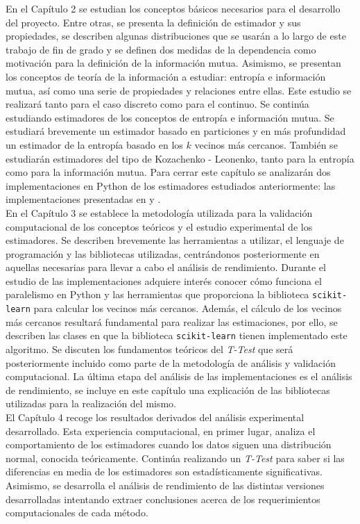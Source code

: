 \documentclass[12pt,a4paper]{report} %
\theoremstyle{definition}
\begin{document}
En el Capítulo 2 se estudian los conceptos básicos necesarios para el desarrollo del proyecto. Entre otras, se presenta la definición de estimador y sus propiedades, se describen algunas distribuciones que se usarán a lo largo de este trabajo de fin de grado y se definen dos medidas de la dependencia como motivación para la definición de la información mutua. Asimismo, se presentan los conceptos de teoría de la información a estudiar: entropía e información mutua, así como una serie de propiedades y relaciones entre ellas. Este estudio se realizará tanto para el caso discreto como para el continuo. Se continúa estudiando estimadores de los conceptos de entropía e información mutua. Se estudiará brevemente un estimador basado en particiones y en más profundidad un estimador de la entropía basado en los $k$ vecinos más cercanos. También se estudiarán estimadores del tipo de Kozachenko - Leonenko, tanto para la entropía como para la información mutua. Para cerrar este capítulo se analizarán dos implementaciones en Python de los estimadores estudiados anteriormente: las implementaciones presentadas en \cite{estimating} y \cite{npeet}.\\

En el Capítulo 3 se establece la metodología utilizada para la validación computacional de los conceptos teóricos y el estudio experimental de los estimadores. Se describen brevemente las herramientas a utilizar, el lenguaje de programación y las bibliotecas utilizadas, centrándonos posteriormente en aquellas necesarias para llevar a cabo el análisis de rendimiento. Durante el estudio de las implementaciones adquiere interés conocer cómo funciona el paralelismo en Python y las herramientas que proporciona la biblioteca \texttt{scikit-learn} para calcular los vecinos más cercanos. Además, el cálculo de los vecinos más cercanos resultará fundamental para realizar las estimaciones, por ello, se describen las clases en que la biblioteca \texttt{scikit-learn} tienen implementado este algoritmo. Se discuten los fundamentos teóricos del \textit{T-Test} que será posteriormente incluido como parte de la metodología de análisis y validación computacional. La última etapa del análisis de las implementaciones es el análisis de rendimiento, se incluye en este capítulo una explicación de las bibliotecas utilizadas para la realización del mismo.\\

El Capítulo 4 recoge los resultados derivados del análisis experimental desarrollado. Esta experiencia computacional, en primer lugar, analiza el comportamiento de los estimadores cuando los datos siguen una distribución normal, conocida teóricamente. Continúa realizando un \textit{T-Test} para saber si las diferencias en media de los estimadores son estadísticamente significativas. Asimismo, se desarrolla el análisis de rendimiento de las distintas versiones desarrolladas intentando extraer conclusiones acerca de los requerimientos computacionales de cada método.\\
\end{document}
